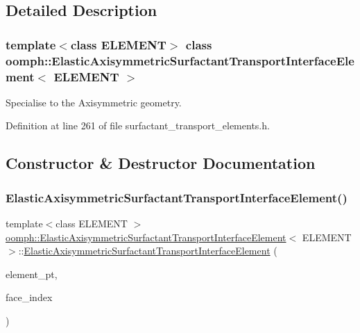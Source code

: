 \subsection{Detailed Description}
\subsubsection*{template$<$class E\+L\+E\+M\+E\+NT$>$\newline
class oomph\+::\+Elastic\+Axisymmetric\+Surfactant\+Transport\+Interface\+Element$<$ E\+L\+E\+M\+E\+N\+T $>$}

Specialise to the Axisymmetric geometry. 

Definition at line 261 of file surfactant\+\_\+transport\+\_\+elements.\+h.



\subsection{Constructor \& Destructor Documentation}
\mbox{\label{classoomph_1_1ElasticAxisymmetricSurfactantTransportInterfaceElement_a7e0f4dbf25bf0556a2675e599eeb6365}} 
\subsubsection{\texorpdfstring{Elastic\+Axisymmetric\+Surfactant\+Transport\+Interface\+Element()}{ElasticAxisymmetricSurfactantTransportInterfaceElement()}}
{\footnotesize\ttfamily template$<$class E\+L\+E\+M\+E\+NT $>$ \\
\hyperlink{classoomph_1_1ElasticAxisymmetricSurfactantTransportInterfaceElement}{oomph\+::\+Elastic\+Axisymmetric\+Surfactant\+Transport\+Interface\+Element}$<$ E\+L\+E\+M\+E\+NT $>$\+::\hyperlink{classoomph_1_1ElasticAxisymmetricSurfactantTransportInterfaceElement}{Elastic\+Axisymmetric\+Surfactant\+Transport\+Interface\+Element} (\begin{DoxyParamCaption}\item[{\hyperlink{classoomph_1_1FiniteElement}{Finite\+Element} $\ast$const \&}]{element\+\_\+pt,  }\item[{const int \&}]{face\+\_\+index }\end{DoxyParamCaption})\hspace{0.3cm}{\ttfamily [inline]}}



